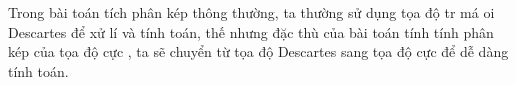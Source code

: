 \documentclass[preview]{standalone}
\begin{document}
\begin{center}
Trong bài toán tích phân kép thông thường, ta thường sử dụng tọa độ tr má oi Descartes để xử lí và tính toán, thế nhưng đặc thù của bài toán tính tính phân kép của tọa độ cực , ta sẽ chuyển từ tọa độ Descartes sang tọa độ cực để dễ dàng tính toán.
\end{center}
\end{document}

